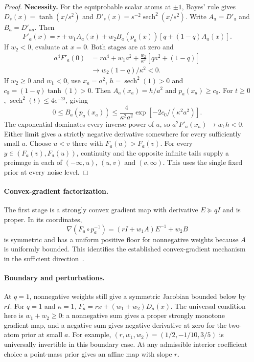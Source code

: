 \documentclass[10pt,twocolumn,letterpaper]{article}
\begin{document}
\begin{proof}
\textbf{Necessity.}
For the equiprobable scalar atoms at $\pm1$, Bayes' rule gives $D_s(x)=\tanh(x/s^2)$ and $D'_s(x)=s^{-2}\operatorname{sech}^2(x/s^2)$. Write $A_a=D'_a$ and $B_a=D'_{\kappa a}$. Then
\[
 F'_a(x)=r+w_1 A_a(x)+w_2 B_a(p_a(x))[q+(1-q)A_a(x)].
\]
If $w_2<0$, evaluate at $x=0$. Both stages are at zero and
\[
 \begin{aligned}
 a^4F'_a(0)&=ra^4+w_1a^2+\frac{w_2}{\kappa^2}[qa^2+(1-q)]\\
 &\longrightarrow w_2(1-q)/\kappa^2<0.
 \end{aligned}
\]
If $w_2\ge0$ and $w_1<0$, use $x_a=a^2$, $h=\operatorname{sech}^2(1)>0$ and $c_0=(1-q)\tanh(1)>0$. Then $A_a(x_a)=h/a^2$ and $p_a(x_a)\ge c_0$. For $t\ge0$, $\operatorname{sech}^2(t)\le4e^{-2t}$, giving
\[
 0\le B_a(p_a(x_a))\le
 \frac{4}{\kappa^2a^2}\exp[-2c_0/(\kappa^2a^2)].
\]
The exponential dominates every inverse power of $a$, so $a^2F'_a(x_a)\to w_1h<0$. Either limit gives a strictly negative derivative somewhere for every sufficiently small $a$. Choose $u<v$ there with $F_a(u)>F_a(v)$. For every $y\in(F_a(v),F_a(u))$, continuity and the opposite infinite tails supply a preimage in each of $(-\infty,u)$, $(u,v)$ and $(v,\infty)$. This uses the single fixed prior at every noise level.
\end{proof}

\paragraph{Convex-gradient factorization.}
The first stage is a strongly convex gradient map with derivative $E\succeq qI$ and is proper. In its coordinates,
\[
 \nabla(F_a\circ p_a^{-1})=(rI+w_1 A)E^{-1}+w_2B
\]
is symmetric and has a uniform positive floor for nonnegative weights because $A$ is uniformly bounded. This identifies the established convex-gradient mechanism in the sufficient direction~\cite{huang2021}.

\paragraph{Boundary and perturbations.}
At $q=1$, nonnegative weights still give a symmetric Jacobian bounded below by $rI$. For $q=1$ and $\kappa=1$, $F_a=rx+(w_1+w_2)D_a(x)$. The universal condition here is $w_1+w_2\ge0$: a nonnegative sum gives a proper strongly monotone gradient map, and a negative sum gives negative derivative at zero for the two-atom prior at small $a$. For example, $(r,w_1,w_2)=(1/2,-1/10,3/5)$ is universally invertible in this boundary case. At any admissible interior coefficient choice a point-mass prior gives an affine map with slope $r$.
\end{document}
